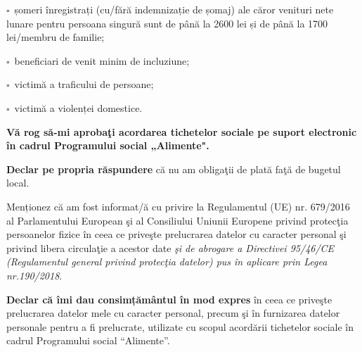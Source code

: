 \documentclass[11pt,a4paper]{article}
\newcommand{\checkboxempty}{$\square$}
\begin{document}
\vspace{0.2cm}

\hspace{0.5cm}\checkboxempty\ șomeri înregistrați (cu/fără indemnizație de șomaj) ale căror venituri nete lunare pentru persoana singură sunt de până la 2600 lei și de până la 1700 lei/membru de familie;

\vspace{0.2cm}

\hspace{0.5cm}\checkboxempty\ beneficiari de venit minim de incluziune;

\vspace{0.2cm}

\hspace{0.5cm}\checkboxempty\ victimă a traficului de persoane;

\vspace{0.2cm}

\hspace{0.5cm}\checkboxempty\ victimă a violenței domestice.

\vspace{0.4cm}

\hspace{1cm}\textbf{Vă rog să-mi aprobaţi acordarea tichetelor sociale pe suport electronic în cadrul Programului social „Alimente".}

\vspace{0.3cm}

\hspace{1cm}\textbf{Declar pe propria răspundere} că nu am obligaţii de plată faţă de bugetul local.

\vspace{0.3cm}

\hspace{1cm}Menționez că am fost informat/ă cu privire la Regulamentul (UE) nr. 679/2016 al Parlamentului European şi al Consiliului Uniunii Europene privind protecţia persoanelor fizice în ceea ce priveşte prelucrarea datelor cu caracter personal şi privind libera circulaţie a acestor date \textit{şi de abrogare a Directivei 95/46/CE (Regulamentul general privind protecţia datelor) pus în aplicare prin Legea nr.190/2018}.

\vspace{0.3cm}

\hspace{1cm}\textbf{Declar că îmi dau consimțământul în mod expres} în ceea ce priveşte prelucrarea datelor mele cu caracter personal, precum şi în furnizarea datelor personale pentru a fi prelucrate, utilizate cu scopul acordării tichetelor sociale în cadrul Programului social ``Alimente''.
\end{document}
